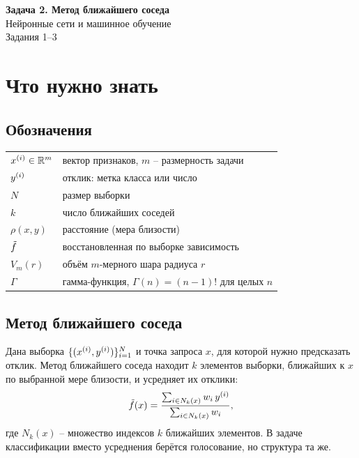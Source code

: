 \documentclass[12pt,a4paper]{article}
\begin{document}
\begin{center}
  {\large\bfseries Задача 2. Метод ближайшего соседа}\\[1mm]
  Нейронные сети и машинное обучение\\[1mm]
  Задания 1--3
\end{center}

\section{Что нужно знать}

\subsection{Обозначения}

\begin{center}
\begin{tabular}{ll}
\toprule
$x^{(i)} \in \mathbb{R}^m$ & вектор признаков, $m$ -- размерность задачи \\
$y^{(i)}$ & отклик: метка класса или число \\
$N$ & размер выборки \\
$k$ & число ближайших соседей \\
$\rho(x, y)$ & расстояние (мера близости) \\
$\tilde{f}$ & восстановленная по выборке зависимость \\
$V_m(r)$ & объём $m$-мерного шара радиуса $r$ \\
$\Gamma$ & гамма-функция, $\Gamma(n) = (n-1)!$ для целых $n$ \\
\bottomrule
\end{tabular}
\end{center}

\subsection{Метод ближайшего соседа}

Дана выборка $\{(x^{(i)}, y^{(i)})\}_{i=1}^{N}$ и точка запроса $x$, для которой
нужно предсказать отклик. Метод ближайшего соседа находит $k$ элементов выборки,
ближайших к $x$ по выбранной мере близости, и усредняет их отклики:
\begin{equation}\label{eq:knn}
  \tilde{f}(x) = \frac{\sum_{i \in N_k(x)} w_i\,y^{(i)}}{\sum_{i \in N_k(x)} w_i},
\end{equation}
где $N_k(x)$ -- множество индексов $k$ ближайших элементов. В задаче
классификации вместо усреднения берётся голосование, но структура та же.
\end{document}
